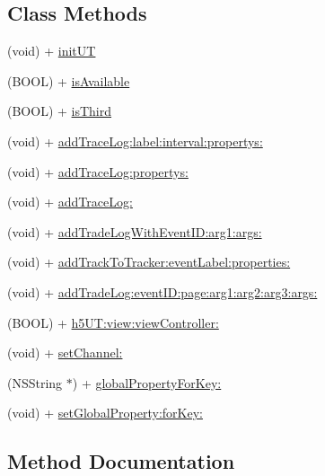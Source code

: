 \subsection*{Class Methods}
\begin{DoxyCompactItemize}
\item 
(void) + \mbox{\hyperlink{interface_alibc_u_t_a814baf6bcf6fefa7360010225ea51da4}{init\+UT}}
\item 
(B\+O\+OL) + \mbox{\hyperlink{interface_alibc_u_t_ad89a91c2686a9c08292ea6b1b5dc7877}{is\+Available}}
\item 
(B\+O\+OL) + \mbox{\hyperlink{interface_alibc_u_t_ab64f9a68175c5576aec8e75daab8169e}{is\+Third}}
\item 
(void) + \mbox{\hyperlink{interface_alibc_u_t_ab76aa12e36ea822cdc92629c52068ff9}{add\+Trace\+Log\+:label\+:interval\+:propertys\+:}}
\item 
(void) + \mbox{\hyperlink{interface_alibc_u_t_ac67a91a73dae12caa70de13b3d3bebae}{add\+Trace\+Log\+:propertys\+:}}
\item 
(void) + \mbox{\hyperlink{interface_alibc_u_t_a9902e243279bcec6be0d85dff8ce215e}{add\+Trace\+Log\+:}}
\item 
(void) + \mbox{\hyperlink{interface_alibc_u_t_a9be17e4719489e97ae916036e80e51c8}{add\+Trade\+Log\+With\+Event\+I\+D\+:arg1\+:args\+:}}
\item 
(void) + \mbox{\hyperlink{interface_alibc_u_t_a740a49f6291406bfd5d4f9b7bdd9d0e2}{add\+Track\+To\+Tracker\+:event\+Label\+:properties\+:}}
\item 
(void) + \mbox{\hyperlink{interface_alibc_u_t_a85d550fec2295919ceb24d01d17e615c}{add\+Trade\+Log\+:event\+I\+D\+:page\+:arg1\+:arg2\+:arg3\+:args\+:}}
\item 
(B\+O\+OL) + \mbox{\hyperlink{interface_alibc_u_t_abf85a849d370adda3cf22123dd952088}{h5\+U\+T\+:view\+:view\+Controller\+:}}
\item 
(void) + \mbox{\hyperlink{interface_alibc_u_t_ac610e7c624d9770bc4deda8e8fd6a6f6}{set\+Channel\+:}}
\item 
(N\+S\+String $\ast$) + \mbox{\hyperlink{interface_alibc_u_t_a800b6266567384e446ee1128a241fd52}{global\+Property\+For\+Key\+:}}
\item 
(void) + \mbox{\hyperlink{interface_alibc_u_t_abadc17969d2a8bc7b9d4f8eeda8fa3ec}{set\+Global\+Property\+:for\+Key\+:}}
\end{DoxyCompactItemize}


\subsection{Method Documentation}
\mbox{\label{interface_alibc_u_t_a9902e243279bcec6be0d85dff8ce215e}} 
